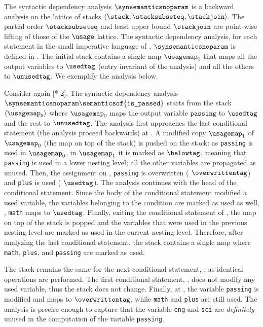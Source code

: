 The syntactic dependency analysis $\synsemanticsnoparam$ is a backward analysis on the lattice of stacks $\langle\stack, \stacksubseteq,\stackjoin\rangle$. The partial order $\stacksubseteq$ and least upper bound $\stackjoin$ are point-wise lifting of those of the $\usage$ lattice. The syntactic dependency analysis, for each statement in the small imperative language of , $\synsemanticsnoparam$ is defined in .
The initial stack contains a single map $\usagemap_0$ that maps all the output variables to $\usedtag$ (entry invariant of the analysis) and all the others to $\unusedtag$.
We exemplify the analysis below.

\begin{example}
  Consider again [*-2]. The syntactic dependency analysis $\synsemanticsnoparam\semanticsof{\texttt{is\_passed}}$ starts from the stack $\langle \usagemap_0 \rangle$ where $\usagemap_0$ maps the output variable $\texttt{passing}$ to $\usedtag$ and the rest to $\unusedtag$.
  The analysis first approaches the last conditional statement (the analysis proceed backwards) at .
  A modified copy $\usagemap_1$ of $\usagemap_0$ (the map on top of the stack) is pushed on the stack:
  as \texttt{passing} is used in $\usagemap_0$, in $\usagemap_1$ it is marked as $\belowtag$, meaning that \texttt{passing} is used in a lower nesting level; all the other variables are propagated as unused.
  Then, the assignment on , \texttt{passing} is overwritten (\cf{} $\overwrittentag$) and \texttt{plus} is used (\cf{} $\usedtag$).
  The analysis continues with the head of the conditional statement.
  Since the body of the conditional statement modified a used variable, the variables belonging to the condition are marked as used as well, \ie, \texttt{math} maps to $\usedtag$.
  Finally, exiting the conditional statement of , the map on top of the stack is popped and the variables that were used in the previous nesting level are marked as used in the current nesting level.
  Therefore, after analyzing the last conditional statement, the stack contains a single map where \texttt{math}, \texttt{plus}, and \texttt{passing} are marked as used.

  The stack remains the same for the next conditional statement, , as identical operations are performed.
  The first conditional statement, \cf{} , does not modify any used variable, thus the stack does not change.
  Finally, at , the variable \texttt{passing} is modified and maps to $\overwrittentag$, while \texttt{math} and \texttt{plus} are still used.
  The analysis is precise enough to capture that the variable \texttt{eng} and \texttt{sci} are \emph{definitely} unused in the computation of the variable \texttt{passing}.
\end{example}

